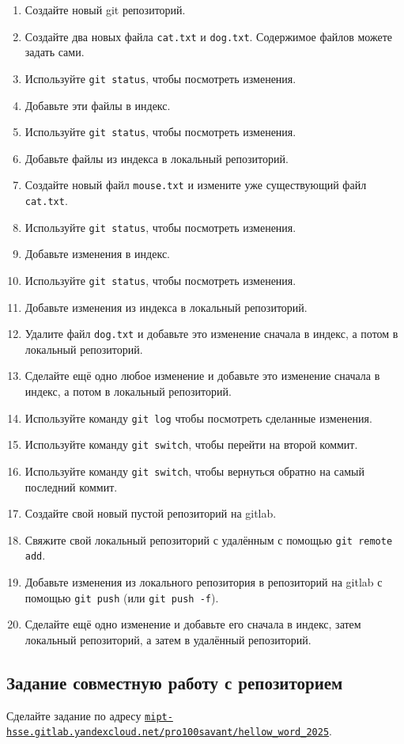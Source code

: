 \documentclass{article}
\begin{document}
\begin{enumerate}
\item Создайте новый git репозиторий.
\item Создайте два новых файла \texttt{cat.txt} и \texttt{dog.txt}. Содержимое файлов можете задать сами.
\item Используйте \texttt{git status}, чтобы посмотреть изменения.
\item Добавьте эти файлы в индекс.
\item Используйте \texttt{git status}, чтобы посмотреть изменения.
\item Добавьте файлы из индекса в локальный репозиторий.
\item Создайте новый файл \texttt{mouse.txt} и измените уже существующий файл \texttt{cat.txt}.
\item Используйте \texttt{git status}, чтобы посмотреть изменения.
\item Добавьте изменения в индекс.
\item Используйте \texttt{git status}, чтобы посмотреть изменения.
\item Добавьте изменения из индекса в локальный репозиторий.
\item Удалите файл \texttt{dog.txt} и добавьте это изменение сначала в индекс, а потом в локальный репозиторий.
\item Сделайте ещё одно любое изменение и добавьте это изменение сначала в индекс, а потом в локальный репозиторий.
\item Используйте команду \texttt{git log} чтобы посмотреть сделанные изменения.
\item Используйте команду \texttt{git switch}, чтобы перейти на второй коммит.
\item Используйте команду \texttt{git switch}, чтобы вернуться обратно на самый последний коммит.
\item Создайте свой новый пустой репозиторий на gitlab.
\item Свяжите свой локальный репозиторий с удалённым с помощью \texttt{git remote add}.
\item Добавьте изменения из локального репозитория в репозиторий на gitlab с помощью \texttt{git push} (или \texttt{git push -f}).
\item Сделайте ещё одно изменение и добавьте его сначала в индекс, затем локальный репозиторий, а затем в удалённый репозиторий.
\end{enumerate}

\subsection*{Задание совместную работу с репозиторием}
Сделайте задание по адресу  \texttt{\href{https://mipt-hsse.gitlab.yandexcloud.net/pro100savant/hellow_word_2025}{mipt-hsse.gitlab.yandexcloud.net/pro100savant/hellow\_word\_2025}}.
\end{document}

